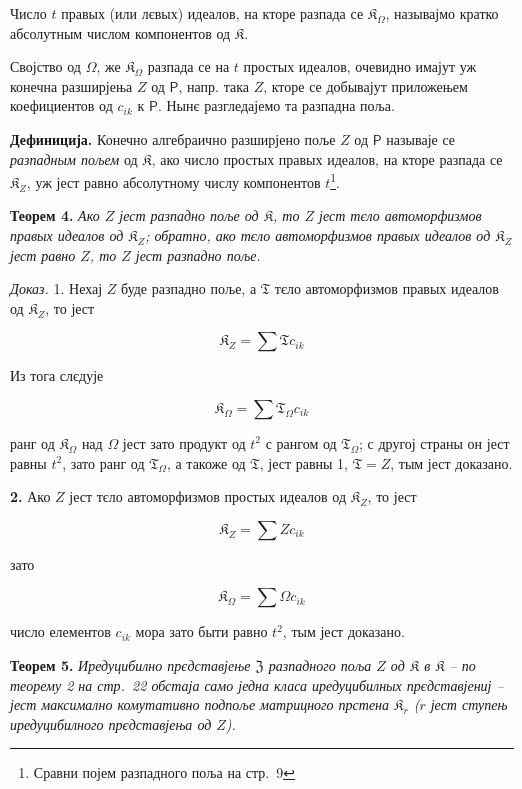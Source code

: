 \documentclass[11pt]{article}
\newcommand{\srcfn}[2]{\footnote{#2}}
\begin{document}
Число \(t\) правых (или лєвых) идеалов, на кторе разпада се \(\mathfrak K_\Omega\), называјмо кратко абсолутным числом компонентов од \(\mathfrak K\).

Својство од \(\Omega\), же \(\mathfrak K_\Omega\) разпада се на \(t\) простых идеалов, очевидно имајут уж конечна разширјења \(Z\) од \(\mathsf P\), напр. така \(Z\), кторе се добывајут приложењем коефициентов од \(c_{ik}\) к \(\mathsf P\). Нынє разгледајемо та разпадна поља.

\textbf{Дефиниција.} Конечно алгебраично разширјено поље \(Z\) од \(\mathsf P\) называје се \emph{разпадным пољем} од \(\mathfrak K\), ако число простых правых идеалов, на кторе разпада се \(\mathfrak K_Z\), уж јест равно абсолутному числу компонентов \(t\)\srcfn{1}{Сравни појем разпадного поља на стр.~9}.

\textbf{Теорем 4.} \emph{Ако \(Z\) јест разпадно поље од \(\mathfrak K\), то \(Z\) јест тєло автоморфизмов правых идеалов од \(\mathfrak K_Z\); обратно, ако тєло автоморфизмов правых идеалов од \(\mathfrak K_Z\) јест равно \(Z\), то \(Z\) јест разпадно поље.}

\emph{Доказ.} 1. Нехај \(Z\) буде разпадно поље, а \(\mathfrak T\) тєло автоморфизмов правых идеалов од \(\mathfrak K_Z\), то јест

\[
\mathfrak K_Z=\sum\mathfrak T c_{ik}
\]

Из тога слєдује

\[
\mathfrak K_\Omega=\sum\mathfrak T_\Omega c_{ik}
\]

ранг од \(\mathfrak K_\Omega\) над \(\Omega\) јест зато продукт од \(t^2\) с рангом од \(\mathfrak T_\Omega\); с другој страны он јест равны \(t^2\), зато ранг од \(\mathfrak T_\Omega\), а такоже од \(\mathfrak T\), јест равны 1, \(\mathfrak T=Z\), тым јест доказано.

\textbf{2.} Ако \(Z\) јест тєло автоморфизмов простых идеалов од \(\mathfrak K_Z\), то јест

\[
\mathfrak K_Z=\sum Zc_{ik}
\]

зато

\[
\mathfrak K_\Omega=\sum\Omega c_{ik}
\]

число елементов \(c_{ik}\) мора зато быти равно \(t^2\), тым јест доказано.

\textbf{Теорем 5.} \emph{Иредуцибилно прєдставјење \(\mathfrak Z\) разпадного поља \(Z\) од \(\mathfrak K\) в \(\mathfrak K\) -- по теорему 2 на стр.~22 обстаја само једна класа иредуцибилных прєдставјениј -- јест максимално комутативно подпоље матрицного прстена \(\mathfrak K_r\) (\(r\) јест ступењ иредуцибилного прєдставјења од \(Z\)).}
\end{document}

